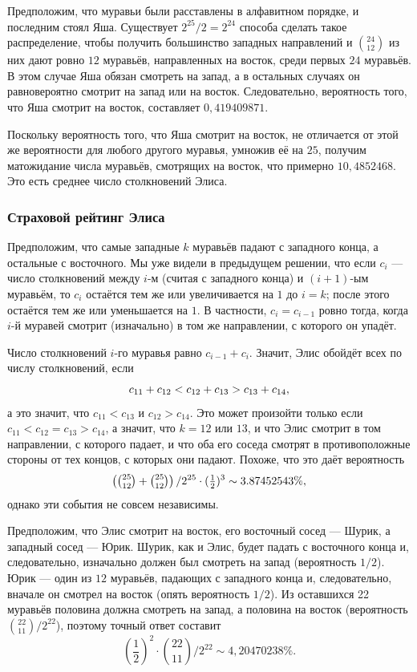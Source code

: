 Предположим, что муравьи были расставлены в алфавитном порядке, и последним стоял Яша.
Существует $2^{25}/2=2^{24}$ способа сделать такое распределение, чтобы получить большинство западных направлений и $\binom{24}{12}$
из них дают ровно $12$ муравьёв, направленных на восток, среди первых $24$ муравьёв.
В этом случае Яша обязан смотреть на запад,
а в остальных случаях он равновероятно смотрит на запад или на восток.
Следовательно, вероятность того, что Яша смотрит на восток, составляет
$0{,}419409871$.

Поскольку вероятность того, что Яша смотрит на восток, не отличается от этой же вероятности для любого другого муравья, умножив её на $25$, получим матожидание числа муравьёв, смотрящих на восток, что примерно $10{,}4852468$.
Это  есть среднее число столкновений Элиса.

\subsubsection*{Страховой рейтинг Элиса}

Предположим, что самые западные $k$ муравьёв падают с западного конца,
а остальные с восточного.
Мы уже видели в предыдущем решении, что если $c_i$ --- число столкновений между $i$-м (считая с западного конца) и $(i + 1)$-ым муравьём, то $c_i$ остаётся тем же или увеличивается на $1$ до $i = k$; после этого остаётся тем же или уменьшается на $1$.
В частности, $c_i=c_{i-1}$ ровно тогда, когда $i$-й муравей смотрит (изначально) в том же направлении, с которого он упадёт.

Число столкновений $i$-го муравья равно $c_{i-1}+c_{i}$.
Значит, Элис обойдёт всех по числу столкновений, если 
\[c_{11}+c_{12}\z<c_{12}\z+c_{13}\z>c_{13}\z+c_{14},\]
а это значит, что  $c_{11}<c_{13}$ и $c_{12}>c_{14}$.
Это может произойти только если 
$c_{11}<c_{12}=c_{13}>c_{14}$,
а значит, что $k = 12$ или $13$, и что Элис смотрит в том направлении, с которого падает,
и что оба его соседа смотрят в противоположные стороны от тех концов, с которых они падают.
Похоже, что это даёт вероятность 
\[\left(\tbinom{25}{12}+\tbinom{25}{12}\right)/2^{25}\cdot (\tfrac12)^3\sim 3.87452543\%,\]
однако эти события не совсем независимы.

Предположим, что Элис смотрит на восток, его восточный сосед --- Шурик, а западный сосед --- Юрик.
Шурик, как и Элис, будет падать с восточного конца и, следовательно, изначально должен был смотреть на запад (вероятность $1/2$).
Юрик --- один из $12$ муравьёв, падающих с западного конца и, следовательно, вначале он смотрел на восток (опять вероятность $1/2$).
Из оставшихся 22 муравьёв половина должна смотреть на запад, а половина на восток (вероятность $\binom{22}{11}/2^{22}$), поэтому точный ответ составит
\[\left(\frac12\right)^2\cdot\binom{22}{11}/2^{22}\sim 4{,}20470238\%.\]

